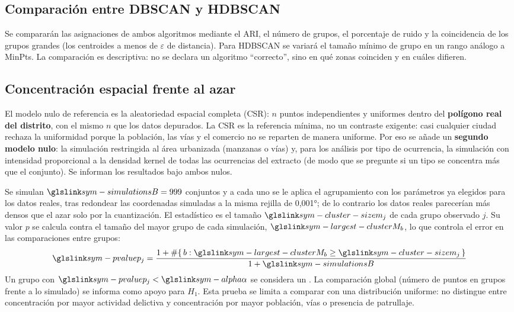 \subsection{Comparación entre DBSCAN y HDBSCAN}

Se compararán las asignaciones de ambos algoritmos mediante el ARI, el número de grupos, el porcentaje de ruido y la coincidencia de los grupos grandes (los centroides a menos de $\varepsilon$ de distancia). Para HDBSCAN se variará el tamaño mínimo de grupo en un rango análogo a MinPts. La comparación es descriptiva: no se declara un algoritmo ``correcto'', sino en qué zonas coinciden y en cuáles difieren.

\subsection{Concentración espacial frente al azar}
\label{sec:montecarlo}

El modelo nulo de referencia es la aleatoriedad espacial completa (CSR): $n$ puntos independientes y uniformes dentro del \textbf{polígono real del distrito}, con el mismo $n$ que los datos depurados. La CSR es la referencia mínima, no un contraste exigente: casi cualquier ciudad rechaza la uniformidad porque la población, las vías y el comercio no se reparten de manera uniforme. Por eso se añade un \textbf{segundo modelo nulo}: la simulación restringida al área urbanizada (manzanas o vías) y, para los análisis por tipo de ocurrencia, la simulación con intensidad proporcional a la densidad kernel de todas las ocurrencias del extracto (de modo que se pregunte si un tipo se concentra más que el conjunto). Se informan los resultados bajo ambos nulos.

Se simulan $\symref{sym-simulations}{B} = 999$ conjuntos y a cada uno se le aplica el agrupamiento con los parámetros ya elegidos para los datos reales, tras redondear las coordenadas simuladas a la misma rejilla de 0,001°; de lo contrario los datos reales parecerían más densos que el azar solo por la cuantización. El estadístico es el tamaño $\symref{sym-cluster-size}{m_j}$ de cada grupo observado $j$. Su valor $p$ se calcula contra el tamaño del mayor grupo de cada simulación, $\symref{sym-largest-cluster}{M_b}$, lo que controla el error en las comparaciones entre grupos:
\begin{equation}
\symref{sym-pvalue}{p_{j}} = \frac{1 + \#\{\, b : \symref{sym-largest-cluster}{M_b} \geq \symref{sym-cluster-size}{m_j} \,\}}{1 + \symref{sym-simulations}{B}}
\label{eq:montecarlo}
\eqtitulo{Valor $p$ Monte Carlo de un grupo espacial.}
\end{equation}
Un grupo con $\symref{sym-pvalue}{p_j} < \symref{sym-alpha}{\alpha}$ se considera un . La comparación global (número de puntos en grupos frente a lo simulado) se informa como apoyo para $H_1$. Esta prueba se limita a comparar con una distribución uniforme: no distingue entre concentración por mayor actividad delictiva y concentración por mayor población, vías o presencia de patrullaje.

